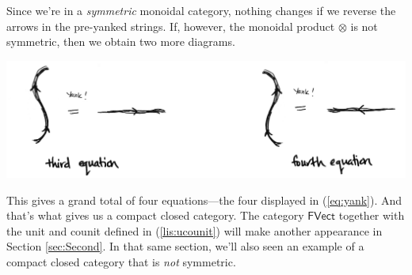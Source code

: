 \documentclass{tufte-handout-tai}
\theoremstyle{plain}
\theoremstyle{definition}
\theoremstyle{remark}
\begin{document}
\newpage
\noindent Since we're in a \textit{symmetric} monoidal category, nothing changes if we reverse the arrows in the pre-yanked strings. If, however, the monoidal product $\otimes$ is not symmetric, then we obtain two more diagrams.
\begin{center}
\includegraphics[width=!,totalheight=!,scale=0.4]{yank4.jpg}
\end{center}

This gives a grand total of four equations---the four displayed in (\ref{eq:yank}). And that's what gives us a compact closed category. The category $\mathsf{FVect}$ together with the unit and counit defined in (\ref{lis:ucounit}) will make another appearance in Section \ref{sec:Second}. In that same section, we'll also seen an example of a compact closed category that is \textit{not} symmetric.

\end{document}
